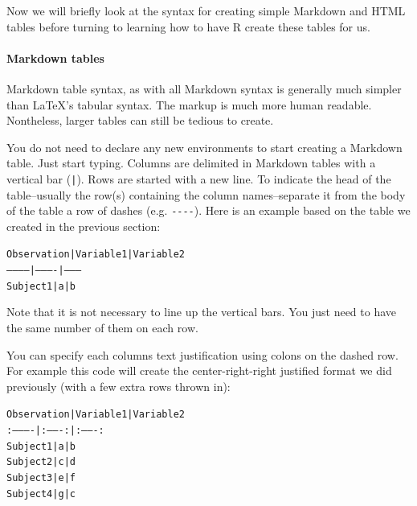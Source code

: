 Now we will briefly look at the syntax for creating simple Markdown and HTML tables before turning to learning how to have R create these tables for us.

\paragraph{Markdown tables}

Markdown table syntax, as with all Markdown syntax is generally much simpler than LaTeX's tabular syntax. The markup is much more human readable. Nontheless, larger tables can still be tedious to create.

You do not need to declare any new environments to start creating a Markdown table. Just start typing. Columns are delimited in Markdown tables with a vertical bar (\texttt{|}). Rows are started with a new line. To indicate the head of the table--usually the row(s) containing the column names--separate it from the body of the table a row of dashes (e.g. \verb|----|). Here is an example based on the table we created in the previous section:

\begin{knitrout}
\color{fgcolor}\begin{kframe}
\begin{alltt}
Observation | Variable1  | Variable2 
----------- | ---------- | --------- 
Subject1    | a          | b        
\end{alltt}
\end{kframe}
\end{knitrout}


\noindent Note that it is not necessary to line up the vertical bars. You just need to have the same number of them on each row.

You can specify each columns text justification using colons on the dashed row. For example this code will create the center-right-right justified format we did previously (with a few extra rows thrown in):

\begin{knitrout}
\color{fgcolor}\begin{kframe}
\begin{alltt}
Observation | Variable1 | Variable2 
:---------- | :-------: | :-------: 
Subject1    | a         | b        
Subject2    | c         | d        
Subject3    | e         | f        
Subject4    | g         | c       
\end{alltt}
\end{kframe}
\end{knitrout}


